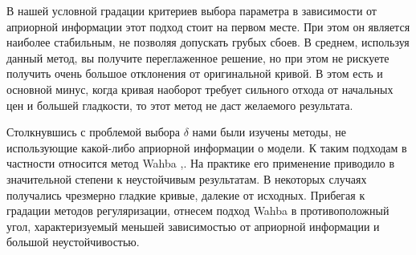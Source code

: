 \documentclass[10pt]{article}
\theoremstyle{definition}
\theoremstyle{remark}
\theoremstyle{plain}
\begin{document}
В нашей условной градации критериев выбора параметра в зависимости от априорной информации этот подход стоит на первом месте. При этом он является наиболее стабильным, не позволяя допускать грубых сбоев. В среднем, используя данный метод, вы получите переглаженное решение, но при этом не рискуете получить очень большое отклонения от оригинальной кривой. В этом есть и основной минус, когда кривая наоборот требует сильного отхода от начальных цен и большей гладкости, то этот метод не даст желаемого результата. 

Столкнувшись с проблемой выбора $\delta$ нами были изучены методы, не использующие какой-либо априорной информации о модели. К таким подходам в частности относится метод Wahba \cite{Wahba},\cite{Neumaier}. На практике его применение приводило в значительной степени к неустойчивым результатам. В некоторых случаях получались чрезмерно гладкие кривые, далекие от исходных.  Прибегая к градации методов регуляризации, отнесем подход Wahba в противоположный угол, характеризуемый меньшей зависимостью от априорной информации и большой неустойчивостью. 
\end{document}
